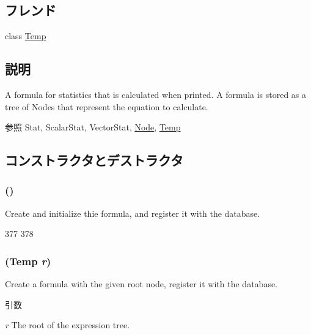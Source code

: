 \subsection*{フレンド}
\begin{DoxyCompactItemize}
\item 
class \hyperlink{classStats_1_1Formula_a39c12a27b0e249e02bb7ef7a1af12f47}{Temp}
\end{DoxyCompactItemize}


\subsection{説明}
A formula for statistics that is calculated when printed. A formula is stored as a tree of Nodes that represent the equation to calculate. \begin{DoxySeeAlso}{参照}
Stat, ScalarStat, VectorStat, \hyperlink{classStats_1_1Node}{Node}, \hyperlink{classStats_1_1Temp}{Temp} 
\end{DoxySeeAlso}


\subsection{コンストラクタとデストラクタ}
\hypertarget{classStats_1_1Formula_a3b99b8902a1d298951025096a0537dd8}{
\subsubsection[{Formula}]{ ()}}
\label{classStats_1_1Formula_a3b99b8902a1d298951025096a0537dd8}
Create and initialize thie formula, and register it with the database. 


\begin{DoxyCode}
377 {
378 }
\end{DoxyCode}
\hypertarget{classStats_1_1Formula_aa382261a63758affb764f96c7281436e}{
\subsubsection[{Formula}]{ ({\bf Temp} {\em r})}}
\label{classStats_1_1Formula_aa382261a63758affb764f96c7281436e}
Create a formula with the given root node, register it with the database. 
\begin{DoxyParams}{引数}
\item[{\em r}]The root of the expression tree. \end{DoxyParams}



